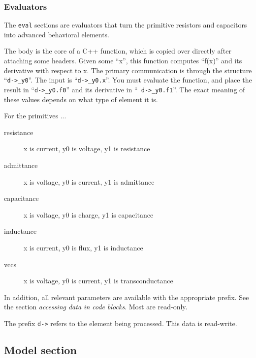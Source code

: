 \subsubsection{Evaluators}

The {\tt eval} sections are evaluators that turn the primitive
resistors and capacitors into advanced behavioral elements.

The body is the core of a C++ function, which is copied over directly
after attaching some headers.  Given some ``x'', this function
computes ``f(x)'' and its derivative with respect to x.  The primary
communication is through the structure ``{\tt d->\_y0}''.  The input is
``{\tt d->\_y0.x}''.  You must evaluate the function, and place the
result in ``{\tt d->\_y0.f0}'' and its derivative in ``{\tt
d->\_y0.f1}''.  The exact meaning of these values depends on what type
of element it is.

For the primitives ...

\begin{description}

\item[resistance]
x is current, y0 is voltage, y1 is resistance

\item[admittance]
x is voltage, y0 is current, y1 is admittance

\item[capacitance]
x is voltage, y0 is charge, y1 is capacitance

\item[inductance]
x is current, y0 is flux, y1 is inductance

\item[vccs]
x is voltage, y0 is current, y1 is transconductance

\end{description}

In addition, all relevant parameters are available with the
appropriate prefix.  See the section {\em accessing data in code
blocks}.  Most are read-only.

The prefix {\tt d->} refers to the element being processed.  This data
is read-write.
\subsection{Model section}


